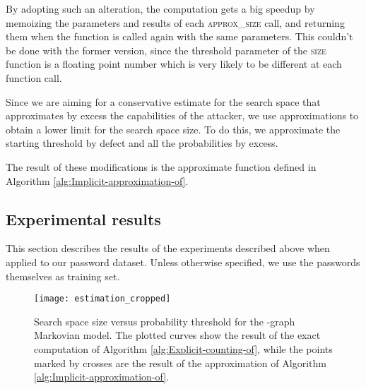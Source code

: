 \documentclass[a4paper,twocolumn]{article}
\providecommand{\tabularnewline}{\\}
\begin{document}
By adopting such an alteration, the computation gets a big speedup
by memoizing the parameters and results of each \textsc{approx\_size}
call, and returning them when the function is called again with the
same parameters. This couldn't be done with the former version, since
the  threshold parameter of the \textsc{size} function is a floating
point number which is very likely to be different at each function
call. 

Since we are aiming for a conservative estimate for the search space
that approximates by excess the capabilities of the attacker, we use
approximations to obtain a lower limit for the search space size.
To do this, we approximate the starting threshold by defect and all
the  probabilities by excess.

The result of these modifications is the approximate function defined
in Algorithm \ref{alg:Implicit-approximation-of}.


\subsection{\label{sub:Experimental-results}Experimental results}

This section describes the results of the experiments described above
when applied to our password dataset. Unless otherwise specified,
we use the passwords themselves as training set.

\begin{comment}
\begin{tabular}{|c|c|c|c|c|c|}
\hline 
 & 1 & 2 & 3 & 4 & 5\tabularnewline
\hline
\hline 
 & 1 (0\%) & 1 (0\%) & 1 (0\%) & 4 (0\%) & 5 (0\%)\tabularnewline
\hline 
 & 10 (0\%) & 8 (11.11\%) & 16 (5.88\%) & 59 (4.84\%) & 170 (9.57\%)\tabularnewline
\hline 
 & 38 (0\%) & 95 (2.06\%) & 496 (3.88\%) & 5,739 (3.06\%) & 19,005 (0.88\%)\tabularnewline
\hline 
 & 1,322 (3.71\%) & 5,070 (4.70\%) & 21,493 (5.48\%) & 107,103 (4.27\%) & 85,238 (1.75\%)\tabularnewline
\hline 
 & 47,988 (4.95\%) & 203,071 (5.47\%) & 530,469 (5.09\%) & 904,545 (3.78\%) & 215,193 (1.94\%)\tabularnewline
\hline 
 & 1,060,785 (5.42\%) & 4,069,913 (4.46\%) & 7,540,827 (4.35\%) & 5,478,552 (3.73\%) & 537,687 (2.10\%)\tabularnewline
\hline
\end{tabular}
\end{comment}
{}

\begin{figure}
\begin{centering}
\texttt{[image: estimation\_cropped]}
\par\end{centering}

\caption{\label{fig:Estimation-of-search}Search space size versus probability
threshold for the -graph Markovian model. The plotted curves show
the result of the exact computation of Algorithm \ref{alg:Explicit-counting-of},
while the points marked by crosses are the result of the approximation
of Algorithm \ref{alg:Implicit-approximation-of}.}

\end{figure}
\end{document}
